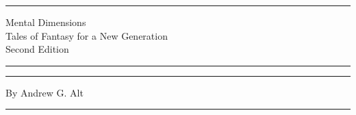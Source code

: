 \thispagestyle{empty}
\begin{center}
	\rule{4.5in}{2pt}

	\vspace{10pt}
	{\Huge Mental Dimensions} \\

	\vspace{.5em}
	{\large Tales of Fantasy for a New Generation} \\

	\vspace{.5em}
	{\normalsize Second Edition}
	\rule{4.5in}{2pt}

	\vspace{3in}
	\rule{4.5in}{2pt}

	\vspace{.5em}
	{\large By Andrew G. Alt}

	\rule{4.5in}{2pt}
\end{center}